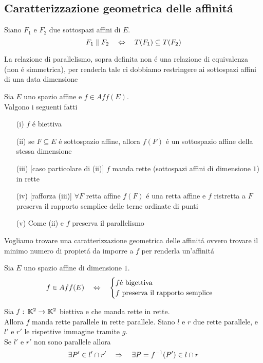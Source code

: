 \subsection{Caratterizzazione geometrica delle affinit\'a }
\begin{defn}[Parallelismo]\bianco
Siano $F_1$ e $F_2$ due sottospazi affini di $E$.\\
$$ F_1 \parallel F_2 \quad \Leftrightarrow \quad T(F_1) \subseteq T(F_2)$$
\begin{oss}La relazione di parallelismo, sopra definita non \'e una relazione di equivalenza (non \'e simmetrica), per renderla tale ci dobbiamo restringere ai sottospazi affini di una data dimensione
\end{oss}
\end{defn}
\spazio
\begin{prop}Sia $E$ uno spazio affine e $f \in Aff(E)$.\\
Valgono i seguenti fatti
\begin{itemize}
\item[(i)] $f$ \'e biettiva
\item[(ii)] se $F\subseteq E$ \'e sottospazio affine, allora $f(F)$ \'e un sottospazio affine della stessa dimensione
\item[(iii)] [caso particolare di (ii)] $f$ manda rette (sottospazi affini di dimensione $1$) in rette
\item[(iv)] [rafforza (iii)] $\forall F $ retta affine $f(F)$ \'e una retta affine e $f$ ristretta a $F$ preserva il rapporto semplice delle terne ordinate di punti
\item[(v)] Come (ii) e $f$ preserva il parallelismo
\end{itemize}
\end{prop}
Vogliamo trovare una caratterizzazione geometrica delle affinit\'a ovvero trovare il minimo numero di propiet\'a da imporre a $f$ per renderla un'affinit\'a
\spazio
\begin{thm}Sia $E$ uno spazio affine di dimensione $1$.
$$ f \in Aff(E) \quad \Leftrightarrow \quad \begin{cases} f \text{\'e bigettiva} \\ f \text{ preserva il rapporto semplice} \end{cases}$$
\end{thm}
\begin{lem}Sia $f:\, \mathbb{K}^2 \to \mathbb{K}^2 $ biettiva e che manda rette in rette.\\
Allora $f$ manda rette parallele in rette parallele.
\proof
Siano $l$ e $r$ due rette parallele, e $l'$ e $r'$ le  rispettive immagine tramite $g$.\\
Se $l'$ e $r'$ non sono parallele allora 
$$ \exists P' \in l'\cap r' \quad \Rightarrow \quad \exists P= f^{-1} (P') \in l \cap r $$
\endproof
\end{lem}
